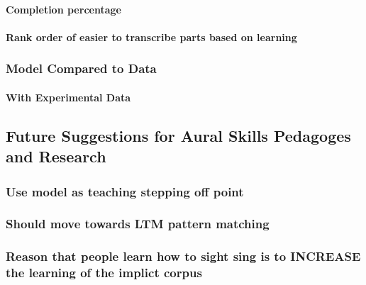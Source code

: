 \documentclass[]{book}
\let\oldparagraph\paragraph
\renewcommand{\paragraph}[1]{\oldparagraph{#1}\mbox{}}
\theoremstyle{definition}
\theoremstyle{definition}
\theoremstyle{definition}
\theoremstyle{remark}
\begin{document}
\hypertarget{completion-percentage}{%
\paragraph{Completion percentage}\label{completion-percentage}}

\hypertarget{rank-order-of-easier-to-transcribe-parts-based-on-learning}{%
\paragraph{Rank order of easier to transcribe parts based on
learning}\label{rank-order-of-easier-to-transcribe-parts-based-on-learning}}

\hypertarget{model-compared-to-data}{%
\subsubsection{Model Compared to Data}\label{model-compared-to-data}}

\hypertarget{with-experimental-data}{%
\paragraph{With Experimental Data}\label{with-experimental-data}}

\hypertarget{future-suggestions-for-aural-skills-pedagoges-and-research}{%
\subsection{Future Suggestions for Aural Skills Pedagoges and
Research}\label{future-suggestions-for-aural-skills-pedagoges-and-research}}

\hypertarget{use-model-as-teaching-stepping-off-point}{%
\subsubsection{Use model as teaching stepping off
point}\label{use-model-as-teaching-stepping-off-point}}

\hypertarget{should-move-towards-ltm-pattern-matching}{%
\subsubsection{Should move towards LTM pattern
matching}\label{should-move-towards-ltm-pattern-matching}}

\hypertarget{reason-that-people-learn-how-to-sight-sing-is-to-increase-the-learning-of-the-implict-corpus}{%
\subsubsection{Reason that people learn how to sight sing is to INCREASE
the learning of the implict
corpus}\label{reason-that-people-learn-how-to-sight-sing-is-to-increase-the-learning-of-the-implict-corpus}}
\end{document}
